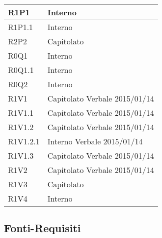 \begin{center}
\begin{longtable}{| p{4cm} | p{4cm} |}

		R1P1  &  Interno \\
		\hline
		R1P1.1  &  Interno \\
		\hline
		R2P2  &  Capitolato \\
		\hline



		R0Q1  &  Interno \\
		\hline
		R0Q1.1  &  Interno \\
		\hline
		R0Q2  &  Interno \\
		\hline




		R1V1 &  Capitolato \newline Verbale 2015/01/14 \\
		\hline
		R1V1.1  &  Capitolato \newline Verbale 2015/01/14 \\
		\hline
		R1V1.2  &  Capitolato \newline Verbale 2015/01/14 \\
		\hline
		R1V1.2.1  &  Interno \newline Verbale 2015/01/14 \\
		\hline
		R1V1.3  &  Capitolato \newline Verbale 2015/01/14 \\
		\hline
		R1V2  &  Capitolato \newline Verbale 2015/01/14 \\
		\hline
		R1V3  &  Capitolato \\
		\hline
		R1V4  &  Interno \\
		\hline

	\end{longtable}
	\egroup
	\end{center}


	\subsection{Fonti-Requisiti} %
	\label{sub:fonti_requisiti}


